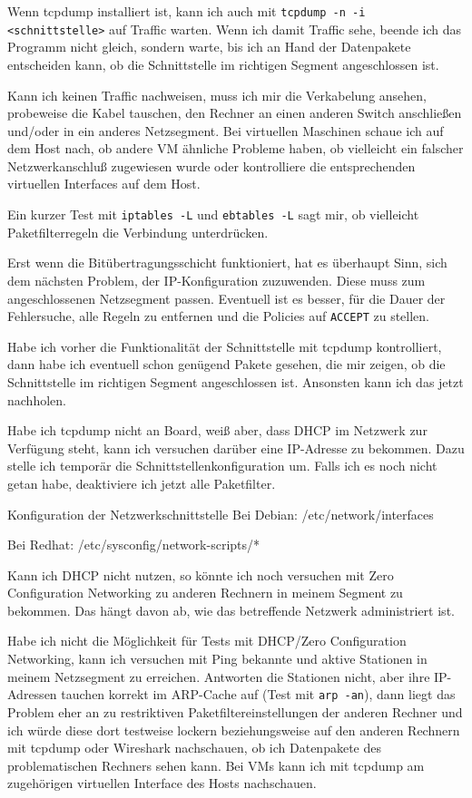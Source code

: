 \begin{normaltext}
  Wenn tcpdump installiert ist, kann ich auch mit
  \verb?tcpdump -n -i <schnittstelle>? auf Traffic warten. Wenn ich damit
  Traffic sehe, beende ich das Programm nicht gleich, sondern warte, bis ich
  an Hand der Datenpakete entscheiden kann, ob die Schnittstelle im richtigen
  Segment angeschlossen ist.

  Kann ich keinen Traffic nachweisen, muss ich mir die Verkabelung ansehen,
  probeweise die Kabel tauschen, den Rechner an einen anderen Switch
  anschließen und/oder in ein anderes Netzsegment. Bei virtuellen Maschinen
  schaue ich auf dem Host nach, ob andere VM ähnliche Probleme haben, ob
  vielleicht ein falscher Netzwerkanschluß zugewiesen wurde oder kontrolliere
  die entsprechenden virtuellen Interfaces auf dem Host.

  Ein kurzer Test mit \verb?iptables -L? und \verb?ebtables -L? sagt mir, ob
  vielleicht Paketfilterregeln die Verbindung unterdrücken.

  Erst wenn die Bitübertragungsschicht funktioniert, hat es überhaupt Sinn,
  sich dem nächsten Problem, der IP-Konfiguration zuzuwenden. Diese muss zum
  angeschlossenen Netzsegment passen. Eventuell ist es besser, für die Dauer
  der Fehlersuche, alle Regeln zu entfernen und die Policies auf \verb?ACCEPT?
  zu stellen.

  Habe ich vorher die Funktionalität der Schnittstelle mit tcpdump
  kontrolliert, dann habe ich eventuell schon genügend Pakete gesehen, die mir
  zeigen, ob die Schnittstelle im richtigen Segment angeschlossen ist.
  Ansonsten kann ich das jetzt nachholen.

  Habe ich tcpdump nicht an Board, weiß aber, dass DHCP im Netzwerk zur
  Verfügung steht, kann ich versuchen darüber eine IP-Adresse zu bekommen.
  Dazu stelle ich temporär die Schnittstellenkonfiguration um. Falls ich es
  noch nicht getan habe, deaktiviere ich jetzt alle Paketfilter.

\begin{Exkursbox}{Konfiguration der Netzwerkschnittstelle}
  Bei Debian: /etc/network/interfaces

  Bei Redhat: /etc/sysconfig/network-scripts/*
\end{Exkursbox}

  Kann ich DHCP nicht nutzen, so könnte ich noch versuchen mit Zero
  Configuration Networking zu anderen Rechnern in meinem Segment zu bekommen.
  Das hängt davon ab, wie das betreffende Netzwerk administriert ist.

  Habe ich nicht die Möglichkeit für Tests mit DHCP/Zero Configuration
  Networking, kann ich versuchen mit Ping bekannte und aktive Stationen in
  meinem Netzsegment zu erreichen. Antworten die Stationen nicht, aber ihre
  IP-Adressen tauchen korrekt im ARP-Cache auf (Test mit \verb?arp -an?), dann
  liegt das Problem eher an zu restriktiven Paketfiltereinstellungen der
  anderen Rechner und ich würde diese dort testweise lockern beziehungsweise
  auf den anderen Rechnern mit tcpdump oder Wireshark nachschauen, ob ich
  Datenpakete des problematischen Rechners sehen kann. Bei VMs kann ich mit
  tcpdump am zugehörigen virtuellen Interface des Hosts nachschauen.


\end{normaltext}
